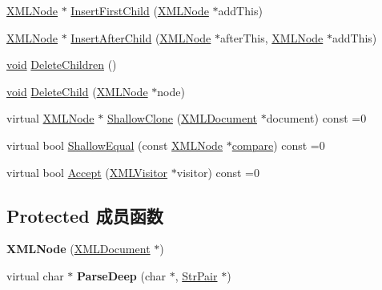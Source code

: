 \begin{DoxyCompactItemize}
\item 
\hyperlink{classtinyxml2_1_1_x_m_l_node}{X\+M\+L\+Node} $\ast$ \hyperlink{classtinyxml2_1_1_x_m_l_node_ac609a8f3ea949027f439280c640bbaf2}{Insert\+First\+Child} (\hyperlink{classtinyxml2_1_1_x_m_l_node}{X\+M\+L\+Node} $\ast$add\+This)
\item 
\hyperlink{classtinyxml2_1_1_x_m_l_node}{X\+M\+L\+Node} $\ast$ \hyperlink{classtinyxml2_1_1_x_m_l_node_a9275138a1b8dd5d8e2c26789bdc23ac8}{Insert\+After\+Child} (\hyperlink{classtinyxml2_1_1_x_m_l_node}{X\+M\+L\+Node} $\ast$after\+This, \hyperlink{classtinyxml2_1_1_x_m_l_node}{X\+M\+L\+Node} $\ast$add\+This)
\item 
\hyperlink{interfacevoid}{void} \hyperlink{classtinyxml2_1_1_x_m_l_node_a0360085cc54df5bff85d5c5da13afdce}{Delete\+Children} ()
\item 
\hyperlink{interfacevoid}{void} \hyperlink{classtinyxml2_1_1_x_m_l_node_a363b6edbd6ebd55f8387d2b89f2b0921}{Delete\+Child} (\hyperlink{classtinyxml2_1_1_x_m_l_node}{X\+M\+L\+Node} $\ast$node)
\item 
virtual \hyperlink{classtinyxml2_1_1_x_m_l_node}{X\+M\+L\+Node} $\ast$ \hyperlink{classtinyxml2_1_1_x_m_l_node_a8402cbd3129d20e9e6024bbcc0531283}{Shallow\+Clone} (\hyperlink{classtinyxml2_1_1_x_m_l_document}{X\+M\+L\+Document} $\ast$document) const =0
\item 
virtual bool \hyperlink{classtinyxml2_1_1_x_m_l_node_a7ce18b751c3ea09eac292dca264f9226}{Shallow\+Equal} (const \hyperlink{classtinyxml2_1_1_x_m_l_node}{X\+M\+L\+Node} $\ast$\hyperlink{structcompare}{compare}) const =0
\item 
virtual bool \hyperlink{classtinyxml2_1_1_x_m_l_node_a81e66df0a44c67a7af17f3b77a152785}{Accept} (\hyperlink{classtinyxml2_1_1_x_m_l_visitor}{X\+M\+L\+Visitor} $\ast$visitor) const =0
\end{DoxyCompactItemize}
\subsection*{Protected 成员函数}
\begin{DoxyCompactItemize}
\item 
\mbox{\label{classtinyxml2_1_1_x_m_l_node_a29868df6ca383d574f584dfdd15105b6}} 
{\bfseries X\+M\+L\+Node} (\hyperlink{classtinyxml2_1_1_x_m_l_document}{X\+M\+L\+Document} $\ast$)
\item 
\mbox{\label{classtinyxml2_1_1_x_m_l_node_a7610d0f603e8b603d2078521811a23c1}} 
virtual char $\ast$ {\bfseries Parse\+Deep} (char $\ast$, \hyperlink{classtinyxml2_1_1_str_pair}{Str\+Pair} $\ast$)
\end{DoxyCompactItemize}
